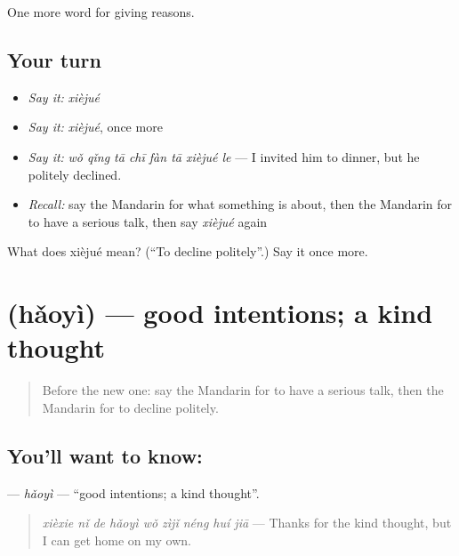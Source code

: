 \begin{grammarlens}[title={What you've built}]
One more word for giving reasons.
\end{grammarlens}

\subsection*{Your turn}
\begin{itemize}
\raggedright
  \item \emph{Say it:} \emph{xièjué}
  \item \emph{Say it:} \emph{xièjué}, once more
  \item \emph{Say it:} \emph{wǒ qǐng tā chī fàn tā xièjué le} — I invited him to dinner, but he politely declined.
  \item \emph{Recall:} say the Mandarin for what something is about, then the Mandarin for to have a serious talk, then say \emph{xièjué} again
\end{itemize}

\begin{tcolorbox}[breakable,colback=teal!4,colframe=teal!35!black,title={Before you move on}]
What does xièjué mean? (\textquotedblleft{}To decline politely\textquotedblright{}.) Say it once more.
\end{tcolorbox}
\section[\texorpdfstring{\zh{好意} (hǎoyì)}{好意 (hǎoyì)}]{ (hǎoyì) — good intentions; a kind thought}

\label{lesson:ZH-C355-haoyi}



\begin{quote}
Before the new one: say the Mandarin for to have a serious talk, then the Mandarin for to decline politely.
\end{quote}

\subsection*{You'll want to know: }
\textbf{} — \emph{hǎoyì} — \textquotedblleft{}good intentions; a kind thought\textquotedblright{}.

\begin{quote}
\emph{xièxie nǐ de hǎoyì wǒ zìjǐ néng huí jiā} — Thanks for the kind thought, but I can get home on my own.
\end{quote}

